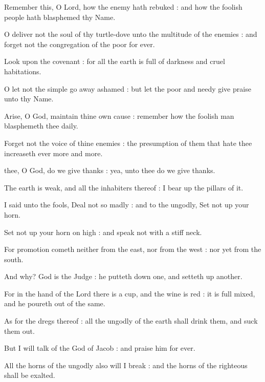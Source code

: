 Remember this, O Lord, how the enemy hath rebuked : and how the foolish people hath blasphemed thy Name.\par
{}O deliver not the soul of thy turtle-dove unto the multitude of the enemies : and forget not the congregation of the poor for ever.\par
{}Look upon the covenant : for all the earth is full of darkness and cruel habitations.\par
{}O let not the simple go away ashamed : but let the poor and needy give praise unto thy Name.\par
{}Arise, O God, maintain thine own cause : remember how the foolish man blasphemeth thee daily.\par
{}Forget not the voice of thine enemies : the presumption of them that hate thee increaseth ever more and more.\par



 thee, O God, do we give thanks : yea, unto thee do we give thanks.\par
{}
The earth is weak, and all the inhabiters thereof : I bear up the pillars of it.\par
{}I said unto the fools, Deal not so madly : and to the ungodly, Set not up your horn.\par
{}Set not up your horn on high : and speak not with a stiff neck.\par
{}For promotion cometh neither from the east, nor from the west : nor yet from the south.\par
{}And why? God is the Judge : he putteth down one, and setteth up another.\par
{}For in the hand of the Lord there is a cup, and the wine is red : it is full mixed, and he poureth out of the same.\par
{}As for the dregs thereof : all the ungodly of the earth shall drink them, and suck them out.\par
{}But I will talk of the God of Jacob : and praise him for ever.\par
{}All the horns of the ungodly also will I break : and the horns of the righteous shall be exalted.\par

